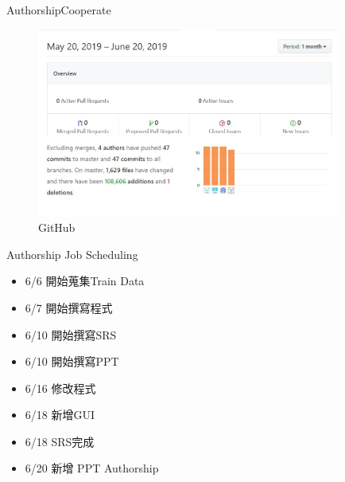 \documentclass{beamer}
\begin{document}
\begin{frame}{Authorship}{Cooperate}
\begin{CJK*}{UTF8}{bsmi}
\begin{figure}[h]
\begin{center}
\includegraphics[width=10cm]{Github.jpg} 
\end{center} 
\label{fig:1} 
\caption{GitHub} 
\end{figure}
\end{CJK*}
\end{frame}

\begin{frame}{Authorship }{Job Scheduling }
\begin{CJK*}{UTF8}{bsmi}
\begin{itemize}
  \item{
   6/6 開始蒐集Train Data
}
  \item {
  6/7 開始撰寫程式
  }
  \item {
   6/10 開始撰寫SRS
  }
 \item{
  6/10 開始撰寫PPT
}
\item{
 6/16 修改程式
}
\item{
 6/18 新增GUI
}
\item{
 6/18 SRS完成
}
\item{
 6/20 新增 PPT Authorship 
}
  \end{itemize}
\end{CJK*}
\end{frame}
\end{document}
